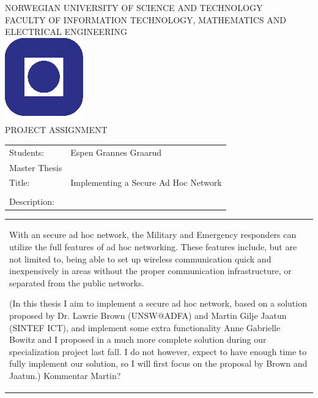
%
\setlength{\parindent}{0pt} 
\setlength{\parskip}{2ex}
\setlength{\parskip}{0pt} %
\begin{titlepage}
\begin{center}
\textsc{NORWEGIAN UNIVERSITY OF SCIENCE AND TECHNOLOGY\\
FACULTY OF  INFORMATION TECHNOLOGY, MATHEMATICS AND ELECTRICAL ENGINEERING} \\
\vspace{0.5cm} 
\includegraphics[scale=0.5]{images/NTNU_logo.png} \\

\vspace{1.0cm}
{\Huge{PROJECT ASSIGNMENT}}
\vspace{1.0cm}

\begin{tabular}{ p{4cm} p{11cm}}

Students:	& Espen Grannes Graarud \\
Master Thesis \\
Title: & Implementing a Secure Ad Hoc Network \\\\
Description: & \\
\end{tabular}
{\small{\begin{tabular}{p{15cm}}
\vspace{0.2cm}
 
With an secure ad hoc network, the Military and Emergency responders can utilize the full features of ad hoc
networking. These features include, but are not limited to, being able to set up wireless communication quick and
inexpensively in areas without the proper communication infrastructure, or separated from the public networks.

(In this thesis I aim to implement a secure ad hoc network, based on a solution proposed by Dr. Lawrie Brown
(UNSW@ADFA) and Martin Gilje Jaatun (SINTEF ICT), and implement some extra functionality Anne Gabrielle Bowitz
and I proposed in a much more complete solution during our specialization project last fall. I do not however,
expect to have enough time to fully implement our solution, so I will first focus on the proposal by Brown and
Jaatun.) Kommentar Martin?



\end{tabular}}}
\end{center}
\end{titlepage}
